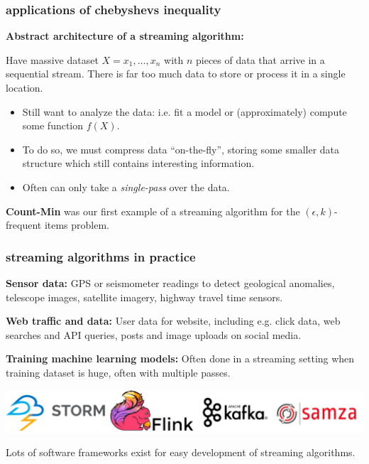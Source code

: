 \documentclass[handout,compress]{beamer}
\newcommand{\E}{\mathbb{E}}
\DeclareMathOperator{\Var}{Var}
\begin{document}
%	
%	
%	
%	


\begin{frame}
	\frametitle{applications of chebyshevs inequality}
	\textbf{Abstract architecture of a streaming algorithm:} 
	
	Have massive dataset $X = {x_1, \ldots, x_n}$ with $n$ pieces of data that arrive in a sequential stream. There is far too much data to store or process it in a single location.
	\begin{itemize}
		\item Still want to analyze the data: i.e. fit a model or (approximately) compute some function $f(X)$.
		\item To do so, we must compress data ``on-the-fly'', storing some smaller data structure which still contains interesting information.
		\item Often can only take a \emph{single-pass} over the data. 
	\end{itemize}
\begin{center}
	\textbf{Count-Min} was our first example of a streaming algorithm for the $(\epsilon,k)$-frequent items problem. 
\end{center}
\end{frame}

\begin{frame}
	\frametitle{streaming algorithms in practice}
	\textbf{Sensor data:} GPS or seismometer readings to detect geological anomalies, telescope images, satellite imagery, highway travel time sensors.
	
	\textbf{Web traffic and data:} User data for website, including e.g. click data, web searches and API queries, posts and image uploads on social media.
	
	\textbf{Training machine learning models:} Often done in a streaming setting when training dataset is huge, often with multiple passes.
	\begin{center}
		\includegraphics[width=.8\textwidth]{streamFrameworks.png}
		
		Lots of software frameworks exist for easy development of streaming algorithms.
	\end{center}
\end{frame}
\end{document}
